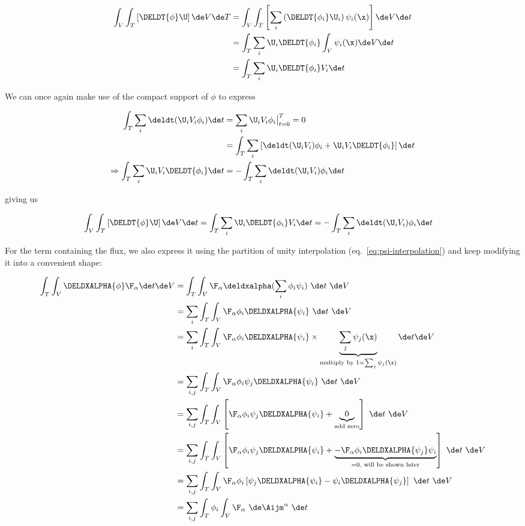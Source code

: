 \begin{align}
\int_V \int_T \left[ \DELDT{\phi} \U \right] \de V \de T &=
    \int_V \int_T \left[ \sum_i \left( \DELDT{\phi_i} \U_i \right) \psi_i(\x) \right] \de V \de t \\
&= \int_T \sum_i \U_i \DELDT{\phi_i} \int_V \psi_i(\x) \de V \de t \\
&= \int_T \sum_i \U_i \DELDT{\phi_i} V_i \de t
\end{align}

We can once again make use of the compact support of $\phi$ to express

\begin{align}
\int_T \sum_i \deldt(\U_i V_i \phi_i) \de t &= \sum_i \U_i V_i \phi_i \big|_{t=0}^T = 0\\
&= \int_T \sum_i \left[ \deldt(\U_i V_i) \phi_i + \U_i V_i \DELDT{\phi_i} \right] \de t \\
\Rightarrow \int_T \sum_i \U_i V_i \DELDT{\phi_i} \de t &=
    - \int_T \sum_i \deldt(\U_i V_i) \phi_i \de t
\end{align}

giving us

\begin{align}
\int_V \int_T \left[ \DELDT{\phi} \U \right] \de V \de t &=
    \int_T \sum_i \U_i \DELDT{\phi_i} V_i \de t =
    - \int_T \sum_i \deldt(\U_i V_i) \phi_i \de t \label{step:ivanova-finished-U}
\end{align}




For the term containing the flux, we also express it using the partition of unity interpolation
(eq.~\ref{eq:psi-interpolation}) and keep modifying it into a convenient shape:

\begin{align}
\int_T \int_V \DELDXALPHA{\phi} \F_\alpha \de t \de V &=
    \int_T \int_V \F_\alpha \deldxalpha (\sum_i \phi_i \psi_i) \ \de t \ \de V
\\
&= \sum_i \int_T \int_V \F_\alpha \phi_i \DELDXALPHA{\psi_i} \ \de t \ \de V
\\
&= \sum_i \int_T \int_V \F_\alpha \phi_i \DELDXALPHA{\psi_i}
    \times \underbrace{ \sum_j \psi_j(\x)}_{\text{multiply by }1 = \sum_j \psi_j(\x)} \de t \de V
\\
&= \sum_{i,j} \int_T \int_V \F_\alpha \phi_i \psi_j \DELDXALPHA{\psi_i} \ \de t \ \de V
\\
&= \sum_{i,j} \int_T \int_V \left[
    \F_\alpha \phi_i \psi_j \DELDXALPHA{\psi_i} +
    \underbrace{0}_{\text{add zero}}
    \right] \ \de t \ \de V
\\
&= \sum_{i,j} \int_T \int_V \left[
\F_\alpha \phi_i \psi_j \DELDXALPHA{\psi_i} +
\underbrace{-\F_\alpha \phi_i \DELDXALPHA{\psi_j} \psi_i}_{=\text{0, will be shown later}}
\right] \ \de t \ \de V
\label{step:ivanova-add-zero}
\\
&= \sum_{i,j} \int_T \int_V \F_\alpha \phi_i \left[
\psi_j \DELDXALPHA{\psi_i} - \psi_i \DELDXALPHA{\psi_j}
\right] \ \de t \ \de V
\\
&= \sum_{i,j} \int_T \phi_i \int_V \F_\alpha \ \de \Aijm^\alpha \ \de t
\label{step:ivanova-intermediate-F}
\end{align}

